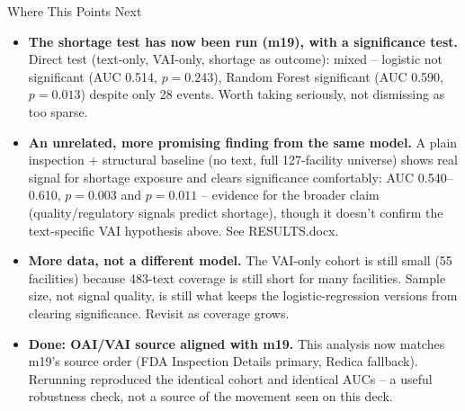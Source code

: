 \documentclass[aspectratio=169,10pt]{beamer}
\begin{document}
\begin{frame}{Where This Points Next}
\begin{itemize}
  \setlength{\itemsep}{9pt}
  \item \textbf{The shortage test has now been run (m19), with a significance test.} Direct test
        (text-only, VAI-only, shortage as outcome): mixed -- logistic not significant (AUC 0.514,
        $p{=}0.243$), Random Forest significant (AUC 0.590, $p{=}0.013$) despite only 28 events.
        Worth taking seriously, not dismissing as too sparse.
  \item \textbf{An unrelated, more promising finding from the same model.} A plain inspection +
        structural baseline (no text, full 127-facility universe) shows real signal for shortage
        exposure and clears significance comfortably: AUC 0.540--0.610, $p{=}0.003$ and
        $p{=}0.011$ -- evidence for the broader claim (quality/regulatory signals predict
        shortage), though it doesn't confirm the text-specific VAI hypothesis above. See
        RESULTS.docx.
  \item \textbf{More data, not a different model.} The VAI-only cohort is still small (55
        facilities) because 483-text coverage is still short for many facilities. Sample size,
        not signal quality, is still what keeps the logistic-regression versions from clearing
        significance. Revisit as coverage grows.
  \item \textbf{Done: OAI/VAI source aligned with m19.} This analysis now matches m19's source
        order (FDA Inspection Details primary, Redica fallback). Rerunning reproduced the
        identical cohort and identical AUCs -- a useful robustness check, not a source of the
        movement seen on this deck.
\end{itemize}
\end{frame}
\end{document}
